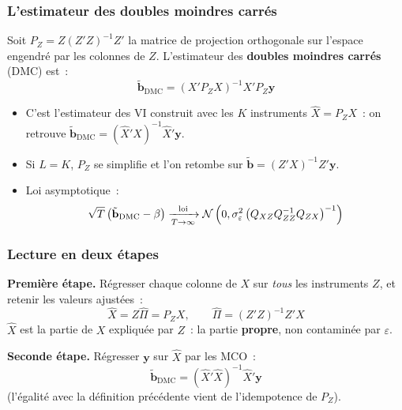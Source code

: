 \documentclass[10pt]{beamer}
\begin{document}
\begin{frame}
  \frametitle{L'estimateur des doubles moindres carrés}

  \begin{defn}{}
    Soit $P_Z = Z\left( Z'Z \right)^{-1}Z'$ la matrice de projection orthogonale
    sur l'espace engendré par les colonnes de $Z$. L'estimateur des
    \textbf{doubles moindres carrés} (DMC) est~:
    \[
      \tilde{\mathbf b}_{\text{DMC}} = \left( X'P_ZX \right)^{-1}X'P_Z\mathbf y
    \]
  \end{defn}

  \medskip

  \begin{itemize}

  \item C'est l'estimateur des VI construit avec les $K$ instruments
    $\hat X = P_ZX$~: on retrouve
    $\tilde{\mathbf b}_{\text{DMC}} = (\hat X'X)^{-1}\hat X'\mathbf y$.\newline

  \item Si $L=K$, $P_Z$ se simplifie et l'on retombe sur
    $\tilde{\mathbf b} = (Z'X)^{-1}Z'\mathbf y$.\newline

  \item Loi asymptotique~:
    \[
      \sqrt{T}\left( \tilde{\mathbf b}_{\text{DMC}} - \beta \right) \xrightarrow[T\rightarrow\infty]{\text{loi}} \mathcal N\left(0,\sigma_{\varepsilon}^2\left( Q_{XZ}Q_{ZZ}^{-1}Q_{ZX} \right)^{-1}\right)
    \]

  \end{itemize}

\end{frame}


\begin{frame}
  \frametitle{Lecture en deux étapes}

  \textbf{Première étape.} Régresser chaque colonne de $X$ sur \emph{tous} les
  instruments $Z$, et retenir les valeurs ajustées~:
  \[
    \hat X = Z\hat\Pi = P_ZX, \qquad \hat\Pi = \left( Z'Z \right)^{-1}Z'X
  \]
  $\hat X$ est la partie de $X$ expliquée par $Z$~: la partie \textbf{propre},
  non contaminée par $\varepsilon$.

  \bigskip

  \textbf{Seconde étape.} Régresser $\mathbf y$ sur $\hat X$ par les MCO~:
  \[
    \tilde{\mathbf b}_{\text{DMC}} = \left( \hat X'\hat X \right)^{-1}\hat X'\mathbf y
  \]
  (l'égalité avec la définition précédente vient de l'idempotence de $P_Z$).

  \bigskip


\end{frame}
\end{document}
